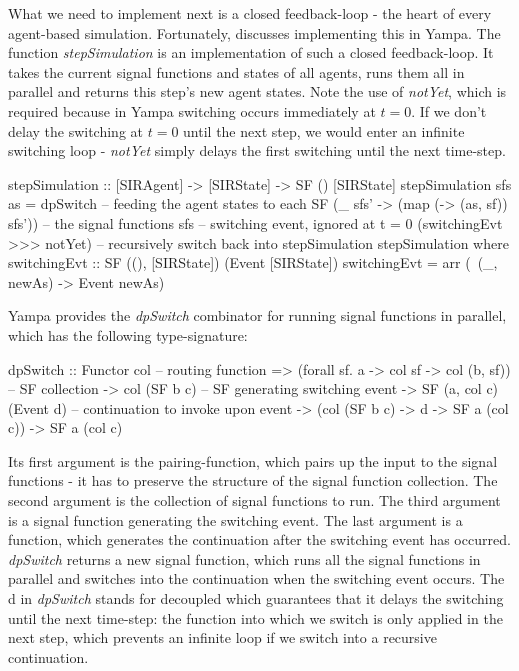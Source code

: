 What we need to implement next is a closed feedback-loop - the heart of every agent-based simulation. Fortunately, \cite{nilsson_functional_2002, courtney_yampa_2003} discusses implementing this in Yampa. The function \textit{stepSimulation} is an implementation of such a closed feedback-loop. It takes the current signal functions and states of all agents, runs them all in parallel and returns this step's new agent states. Note the use of \textit{notYet}, which is required because in Yampa switching occurs immediately at $t = 0$. If we don't delay the switching at $t = 0$ until the next step, we would enter an infinite switching loop - \textit{notYet} simply delays the first switching until the next time-step.

\begin{HaskellCode}
stepSimulation :: [SIRAgent] -> [SIRState] -> SF () [SIRState]
stepSimulation sfs as =
    dpSwitch
      -- feeding the agent states to each SF
      (\_ sfs' -> (map (\sf -> (as, sf)) sfs'))
      -- the signal functions
      sfs
      -- switching event, ignored at t = 0         
      (switchingEvt >>> notYet)
      -- recursively switch back into stepSimulation         
      stepSimulation                            
  where
    switchingEvt :: SF ((), [SIRState]) (Event [SIRState])
    switchingEvt = arr (\ (_, newAs) -> Event newAs)
\end{HaskellCode}

Yampa provides the \textit{dpSwitch} combinator for running signal functions in parallel, which has the following type-signature:

\begin{HaskellCode}
dpSwitch :: Functor col
         -- routing function
         => (forall sf. a -> col sf -> col (b, sf))
         -- SF collection
         -> col (SF b c)
         -- SF generating switching event     
         -> SF (a, col c) (Event d)
         -- continuation to invoke upon event           
         -> (col (SF b c) -> d -> SF a (col c))
         -> SF a (col c)
\end{HaskellCode}

Its first argument is the pairing-function, which pairs up the input to the signal functions - it has to preserve the structure of the signal function collection. The second argument is the collection of signal functions to run. The third argument is a signal function generating the switching event. The last argument is a function, which generates the continuation after the switching event has occurred. \textit{dpSwitch} returns a new signal function, which runs all the signal functions in parallel and switches into the continuation when the switching event occurs. The d in \textit{dpSwitch} stands for decoupled which guarantees that it delays the switching until the next time-step: the function into which we switch is only applied in the next step, which prevents an infinite loop if we switch into a recursive continuation.

